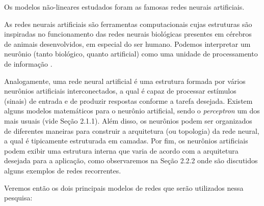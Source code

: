 \documentclass[a4paper, 12pt]{article}
\begin{document}
Os modelos não-lineares estudados foram as famosas redes neurais artificiais.

As redes neurais artificiais são ferramentas computacionais cujas estruturas são inspiradas no funcionamento das redes neurais biológicas presentes em cérebros de animais desenvolvidos, em especial do ser humano. Podemos interpretar um neurônio (tanto biológico, quanto artificial) como uma unidade de processamento de informação \cite{haykin2010neural}. 

Analogamente, uma rede neural artificial é uma estrutura formada por vários neurô\-nios artificiais interconectados, a qual é capaz de processar estímulos (sinais) de entrada e de produzir respostas conforme a tarefa desejada. Existem alguns modelos matemáticos para o neurônio artificial, sendo o \textit{perceptron} um dos mais usuais (vide Seção 2.1.1). Além disso, os neurônios podem ser organizados de diferentes maneiras para construir a arquitetura (ou topologia) da rede neural, a qual é tipicamente estruturada em camadas. Por fim, os neurônios artificiais podem exibir uma estrutura interna que varia de acordo com a arquitetura desejada para a aplicação, como observaremos na Seção 2.2.2 onde são discutidos alguns exemplos de redes recorrentes.

Veremos então os dois principais modelos de redes que serão utilizados nessa pesquisa:
\end{document}
